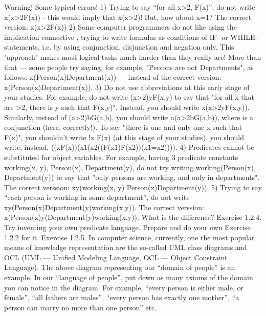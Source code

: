 Warning! Some typical errors!
1) Trying to say ``for all x>2, F(x)'', do not write \forall x(x>2\AND F(x)) - this would imply that \forall x(x>2)! But,
how about x=1? The correct version: \forall x(x>2\IMPLIES F(x))
2) Some computer programmers do not like using the implication connective \IMPLIES , trying to write formulas
as conditions of IF- or WHILE-statements, i.e. by using conjunction, disjunction and negation only. This
"approach" makes most logical tasks much harder than they really are! More than that --- some people try
saying, for example, "Persons are not Departments", as follows:
\forall x(Person(x)\AND \neg Department(x)) --- instead of the correct version: \forall x(Person(x)\IMPLIES \neg Department(x)).
3) Do not use abbreviations at this early stage of your studies. For example, do not write (\forall x>2)\exists yF(x,y)
to say that "for all x that are >2, there is y such that F(x,y)". Instead, you should write
\forall x(x>2\IMPLIES \exists yF(x,y)). Similarly, instead of (\exists a>2)\exists bG(a,b), you should write \exists a(a>2\AND \exists bG(a,b)), where
\AND  is a conjunction (here, correctly!).
To say "there is one and only one x such that F(x)", you shouldn't write \exists !x F(x) (at this stage of your
studies), you should write, instead, ((\exists xF(x))\AND (\forall x1(\forall x2((F(x1)\AND F(x2))\IMPLIES (x1=x2)))).
4) Predicates cannot be substituted for object variables. For example, having 3 predicate constants
working(x, y), Person(x), Department(y), do not try writing working(Person(x), Department(y)) to say
that "only persons are working, and only in departments". The correct verssion: \forall x\forall y(working(x, y)\IMPLIES 
Person(x)\AND Department(y)).
5) Trying to say ``each person is working in some department'', do not write
\forall x\exists y(Person(x)\AND Department(y)\IMPLIES working(x,y)). The correct verssion:
\forall x(Person(x)\IMPLIES \exists y(Department(y)\AND working(x,y)). What is the difference?
Exercise 1.2.4. Try inventing your own predicate language. Prepare and do your own Exercise 1.2.2 for
it.
Exercise 1.2.5. In computer science, currently, one the most popular means of knowledge representation
are the so-called UML class diagrams and OCL (UML --- Unified Modeling Language, OCL --- Object
Constraint Language). The above diagram representing our ``domain of people'' is an example. In our
``language of people'', put down as many axioms of the domain you can notice in the diagram. For
example, ``every person is either male, or female'', ``all fathers are males'', ``every person has exactly one
mother'', ``a person can marry no more than one person'' etc.
